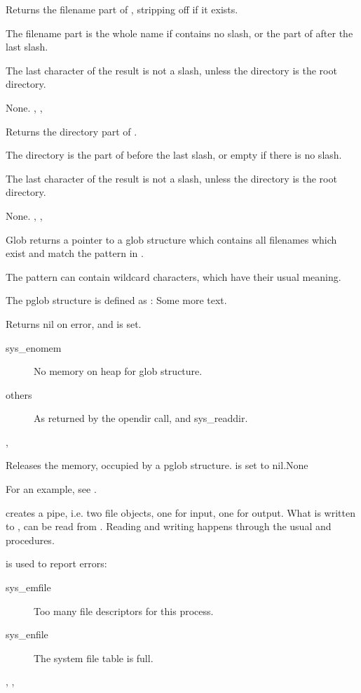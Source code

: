 

{Returns the filename part of , stripping off  if it
exists.

The filename part is the whole name if  contains no slash,
or the part of  after the last slash.

The last character of the result is not a slash, unless the directory is the
root directory.
}
{None.}
{, , }



{Returns the directory part of .

The directory is the part of  before the last slash,
or empty if there is no slash.

The last character of the result is not a slash, unless the directory is the
root directory.
}
{None.}
{, , }



{
Glob returns a pointer to a glob structure which contains all filenames which
exist and match the pattern in .

The pattern can contain wildcard characters, which have their
usual meaning.

The pglob structure is defined as :
Some more text.
}
{ Returns nil on error, and  is set.
\begin{description}
\item[sys\_enomem] No memory on heap for glob structure.
\item[others] As returned by the opendir call, and sys\_readdir.
\end{description}
}
{,  }



 {Releases the memory, occupied by a pglob structure.  is set to nil.}{None}
 {  }

For an example, see .

{ creates a pipe, i.e. two file objects, one for input, one for output.
What is written to , can be read from .
Reading and writing happens through the usual  and
 procedures.
}
{  is used to report errors:
\begin{description}
\item[sys\_emfile] Too many file descriptors for this process.
\item[sys\_enfile] The system file table is full.
\end{description}
}
{, , }

